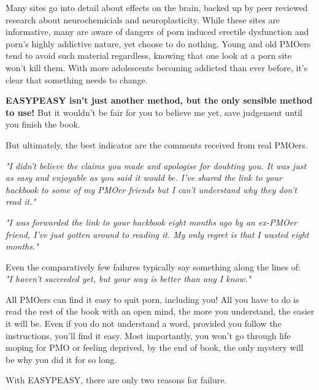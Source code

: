 \documentclass[easypeasy.tex]{subfiles}
\begin{document}
Many sites go into detail about effects on the brain, backed up by peer reviewed research about neurochemicials and neuroplasticity. While these sites are informative, many are aware of dangers of porn induced erectile dysfunction and porn's highly addictive nature, yet choose to do nothing. Young and old PMOers tend to avoid such material regardless, knowing that one look at a porn site won't kill them. With more adolescents becoming addicted than ever before, it's clear that something needs to change.

\textbf{EASYPEASY isn't just another method, but the only sensible method to use!} But it wouldn't be fair for you to believe me yet, save judgement until you finish the book.

But ultimately, the best indicator are the comments received from real PMOers.

\textit{"I didn't believe the claims you made and apologise for doubting you. It was just as easy and enjoyable as you said it would be. I've shared the link to your hackbook to some of my PMOer friends but I can't understand why they don't read it."}

\textit{"I was forwarded the link to your hackbook eight months ago by an ex-PMOer friend, I've just gotten around to reading it. My only regret is that I wasted eight months."}

Even the comparatively few failures typically say something along the lines of:\\ \textit{"I haven't succeeded yet, but your way is better than any I know."}

All PMOers can find it easy to quit porn, including you! All you have to do is read the rest of the book with an open mind, the more you understand, the easier it will be. Even if you do not understand a word, provided you follow the instructions, you'll find it easy. Most importantly, you won't go through life moping for PMO or feeling deprived, by the end of book, the only mystery will be why you did it for so long.

With EASYPEASY, there are only two reasons for failure.
\end{document}
